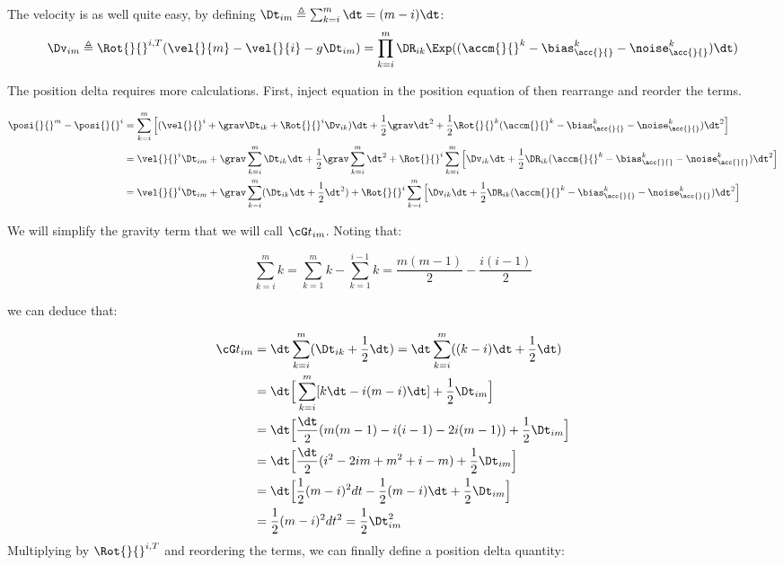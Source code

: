 The velocity is as well quite easy, by defining $\Dt_{im} \triangleq \sum_{k=i}^{m} \dt = (m-i)\dt$:
\begin{equation}
    \Dv_{im} \triangleq \Rot{}{}^{i,T} (\vel{}{m} - \vel{}{i} - g \Dt_{im}) 
    = \prod_{k=i}^{m} \DR_{ik} \Exp((\accm{}{}^k - \bias_{\acc{}{}}^k - \noise_{\acc{}{}}^k)\dt)
    \label{eq:IMUDeltav}
\end{equation}

The position delta requires more calculations. First, inject equation  in the position equation of  then rearrange and reorder the terms.

\begin{equation}
\begin{split}
\posi{}{}^{m} - \posi{}{}^{i} &= \sum_{k=i}^{m} \Big[
(\vel{}{}^i + \grav \Dt_{ik} + \Rot{}{}^i \Dv_{ik})\dt 
+ \frac{1}{2}\grav \dt^2 + \frac{1}{2}\Rot{}{}^{k}(\accm{}{}^k - \bias_{\acc{}{}}^k - \noise_{\acc{}{}}^k)\dt^2 \Big]
\\
&= \vel{}{}^i \Dt_{im} + 
\grav\sum_{k=i}^{m} \Dt_{ik} \dt + \frac{1}{2}\grav \sum_{k=i}^{m} \dt^2 +
\Rot{}{}^i\sum_{k=i}^{m} \Big[\Dv_{ik}\dt +  \frac{1}{2} \DR_{ik} (\accm{}{}^k - \bias_{\acc{}{}}^k - \noise_{\acc{}{}}^k)\dt^2 \Big]
\\
&= \vel{}{}^i \Dt_{im} + 
\grav \sum_{k=i}^{m} (\Dt_{ik} \dt + \frac{1}{2}\dt^2) +
\Rot{}{}^i\sum_{k=i}^{m} \Big[\Dv_{ik}\dt +  \frac{1}{2} \DR_{ik} (\accm{}{}^k - \bias_{\acc{}{}}^k - \noise_{\acc{}{}}^k)\dt^2 \Big]
\end{split}
\end{equation}

We will simplify the gravity term that we will call $\cG t_{im}$. Noting that:

\begin{equation*}
    \sum_{k=i}^{m}k = \sum_{k=1}^{m}k - \sum_{k=1}^{i-1}k = \frac{m(m-1)}{2} - \frac{i(i-1)}{2} 
\end{equation*}

we can deduce that:

\begin{equation*}
\begin{split}
\cG t_{im} 
&= \dt \sum_{k=i}^{m}(\Dt_{ik} + \frac{1}{2}\dt) = \dt \sum_{k=i}^{m}((k -i)\dt + \frac{1}{2}\dt)
\\
&= \dt \Big[ \sum_{k=i}^{m} [ k \dt - i(m-i)\dt ] + \frac{1}{2}\Dt_{im}  \Big] 
\\
&= \dt \Big[ \frac{\dt}{2} (m(m-1) - i(i-1) - 2i(m-1)) + \frac{1}{2}\Dt_{im} \Big] 
\\
&= \dt \Big[ \frac{\dt}{2} (i^2 - 2im + m^2 + i - m) + \frac{1}{2}\Dt_{im} \Big] 
\\
&= \dt \Big[ \frac{1}{2} (m-i)^2dt - \frac{1}{2}(m - i)\dt + \frac{1}{2}\Dt_{im} \Big]
\\
&= \frac{1}{2} (m-i)^2dt^2 = \frac{1}{2} \Dt_{im}^2
\end{split}
\end{equation*}
Multiplying by $\Rot{}{}^{i,T}$ and reordering the terms, we can finally define a position delta quantity:

